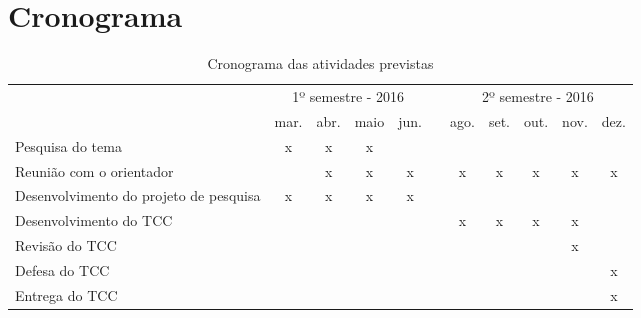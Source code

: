 \section{Cronograma}\label{lcronograma}

\begin{table}[H]
\IBGEtab
{%
	\caption{Cronograma das atividades previstas}\label{tcronograma}
}{%
	\begin{tabular}{lcccccccccc}
	\toprule
	& \multicolumn{4}{c}{1º semestre - 2016} && \multicolumn{5}{c}{2º semestre - 2016} \\
	\cline{2-5}
	\cline{7-11}
	\raisebox{1.5ex}{Etapa}  & mar. & abr. & maio & jun. && ago. & set. & out. & nov. & dez. \\ 
	\midrule \midrule
				  Pesquisa do tema &x&x&x&&&&&&& \\ \hline
				  Reunião com o orientador &&x&x&x&&x&x&x&x&x \\ \hline
				  Desenvolvimento do projeto de pesquisa &x&x&x&x&&&&&& \\ \hline
				  Desenvolvimento do TCC &&&&&&x&x&x&x& \\ \hline
				  Revisão do TCC &&&&&&&&&x& \\ \hline
				  Defesa do TCC &&&&&&&&&&x\\ \hline
				  Entrega do TCC &&&&&&&&&&x\\
	\bottomrule
	\end{tabular}%
}{%
%
}
\end{table}

